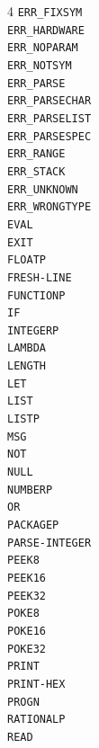 \documentclass[10pt, openany]{book}
\newcommand{\keyword}[1]{\texttt{#1}}
\begin{document}
\begin{multicols}{4}
  \keyword{ERR\_FIXSYM}\\
  \keyword{ERR\_HARDWARE}\\
  \keyword{ERR\_NOPARAM}\\
  \keyword{ERR\_NOTSYM}\\
  \keyword{ERR\_PARSE}\\
  \keyword{ERR\_PARSECHAR}\\
  \keyword{ERR\_PARSELIST}\\
  \keyword{ERR\_PARSESPEC}\\
  \keyword{ERR\_RANGE}\\
  \keyword{ERR\_STACK}\\
  \keyword{ERR\_UNKNOWN}\\
  \keyword{ERR\_WRONGTYPE}\\
  \keyword{EVAL}\\
  \keyword{EXIT}\\
  \keyword{FLOATP}\\
  \keyword{FRESH-LINE}\\
  \keyword{FUNCTIONP}\\
  \keyword{IF}\\
  \keyword{INTEGERP}\\
  \keyword{LAMBDA}\\
  \keyword{LENGTH}\\
  \keyword{LET}\\
  \keyword{LIST}\\
  \keyword{LISTP}\\
  \keyword{MSG}\\
  \keyword{NOT}\\
  \keyword{NULL}\\
  \keyword{NUMBERP}\\
  \keyword{OR}\\
  \keyword{PACKAGEP}\\
  \keyword{PARSE-INTEGER}\\
  \keyword{PEEK8}\\
  \keyword{PEEK16}\\
  \keyword{PEEK32}\\
  \keyword{POKE8}\\
  \keyword{POKE16}\\
  \keyword{POKE32}\\
  \keyword{PRINT}\\
  \keyword{PRINT-HEX}\\
  \keyword{PROGN}\\
  \keyword{RATIONALP}\\
  \keyword{READ}\\

\end{multicols}
\end{document}
